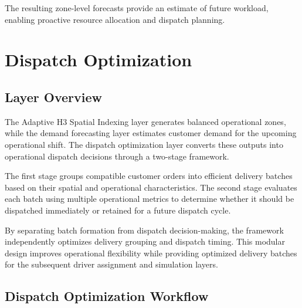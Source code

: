 \documentclass{article}
\begin{document}
The resulting zone-level forecasts provide an estimate of future workload, enabling proactive resource allocation and dispatch planning.

\newpage
\section{Dispatch Optimization}
\label{subsec:dispatch_optimization}

\subsection{Layer Overview}
\label{subsubsec:dispatch_layer_overview}

The Adaptive H3 Spatial Indexing layer generates balanced operational zones, while the demand forecasting layer estimates customer demand for the upcoming operational shift. The dispatch optimization layer converts these outputs into operational dispatch decisions through a two-stage framework.

The first stage groups compatible customer orders into efficient delivery batches based on their spatial and operational characteristics. The second stage evaluates each batch using multiple operational metrics to determine whether it should be dispatched immediately or retained for a future dispatch cycle.

By separating batch formation from dispatch decision-making, the framework independently optimizes delivery grouping and dispatch timing. This modular design improves operational flexibility while providing optimized delivery batches for the subsequent driver assignment and simulation layers.

\subsection{Dispatch Optimization Workflow}
\label{subsec:dispatch_layer_workflow}
\end{document}
